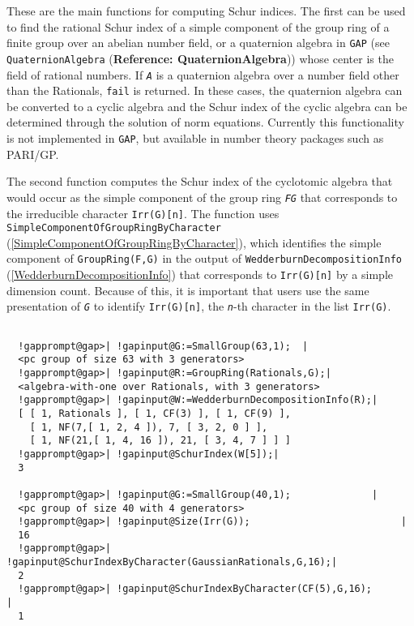 \documentclass[a4paper,11pt]{report}
\begin{document}
{{{ These are the main functions for computing Schur indices. The first can be
used to find the rational Schur index of a simple component of the group ring
of a finite group over an abelian number field, or a quaternion algebra in \texttt{GAP} (see \texttt{QuaternionAlgebra} (\textbf{Reference: QuaternionAlgebra})) whose center is the field of rational numbers. If \mbox{\texttt{\mdseries\slshape A}} is a quaternion algebra over a number field other than the Rationals, \texttt{fail} is returned. In these cases, the quaternion algebra can be converted to a
cyclic algebra and the Schur index of the cyclic algebra can be determined
through the solution of norm equations. Currently this functionality is not
implemented in \texttt{GAP}, but available in number theory packages such as \textsf{PARI/GP}. 

 The second function computes the Schur index of the cyclotomic algebra that
would occur as the simple component of the group ring \mbox{\texttt{\mdseries\slshape FG}} that corresponds to the irreducible character \texttt{Irr(G)[n]}. The function uses \texttt{SimpleComponentOfGroupRingByCharacter} (\ref{SimpleComponentOfGroupRingByCharacter}), which identifies the simple component of \texttt{GroupRing(F,G)} in the output of \texttt{WedderburnDecompositionInfo} (\ref{WedderburnDecompositionInfo}) that corresponds to \texttt{Irr(G)[n]} by a simple dimension count. Because of this, it is important that users use
the same presentation of \mbox{\texttt{\mdseries\slshape G}} to identify \texttt{Irr(G)[n]}, the \mbox{\texttt{\mdseries\slshape n}}-th character in the list \texttt{Irr(G)}. 
\begin{Verbatim}[commandchars=!@|,fontsize=\small,frame=single,label=Example]
  
  !gapprompt@gap>| !gapinput@G:=SmallGroup(63,1);  |
  <pc group of size 63 with 3 generators>
  !gapprompt@gap>| !gapinput@R:=GroupRing(Rationals,G);|
  <algebra-with-one over Rationals, with 3 generators>
  !gapprompt@gap>| !gapinput@W:=WedderburnDecompositionInfo(R);|
  [ [ 1, Rationals ], [ 1, CF(3) ], [ 1, CF(9) ], 
    [ 1, NF(7,[ 1, 2, 4 ]), 7, [ 3, 2, 0 ] ], 
    [ 1, NF(21,[ 1, 4, 16 ]), 21, [ 3, 4, 7 ] ] ]
  !gapprompt@gap>| !gapinput@SchurIndex(W[5]);|
  3
  
  !gapprompt@gap>| !gapinput@G:=SmallGroup(40,1);              |
  <pc group of size 40 with 4 generators>
  !gapprompt@gap>| !gapinput@Size(Irr(G));                          |
  16
  !gapprompt@gap>| !gapinput@SchurIndexByCharacter(GaussianRationals,G,16);|
  2
  !gapprompt@gap>| !gapinput@SchurIndexByCharacter(CF(5),G,16);         |
  1
  

\end{Verbatim}}}}
\end{document}
